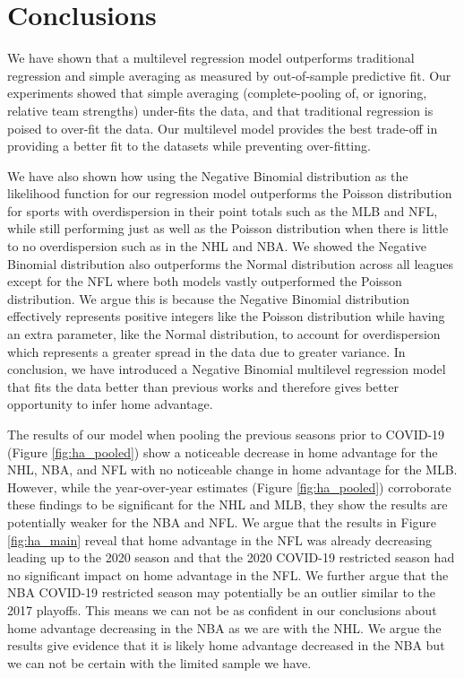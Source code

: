 \section*{Conclusions}

We have shown that a multilevel regression model outperforms traditional regression and simple averaging as measured by out-of-sample predictive fit. Our experiments showed that simple averaging (complete-pooling of, or ignoring, relative team strengths) under-fits the data, and that traditional regression is poised to over-fit the data. Our multilevel model provides the best trade-off in providing a better fit to the datasets while preventing over-fitting. 

We have also shown how using the Negative Binomial distribution as the likelihood function for our regression model outperforms the Poisson distribution for sports with overdispersion in their point totals such as the MLB and NFL, while still performing just as well as the Poisson distribution when there is little to no overdispersion such as in the NHL and NBA. We showed the Negative Binomial distribution also outperforms the Normal distribution across all leagues except for the NFL where both models vastly outperformed the Poisson distribution. We argue this is because the Negative Binomial distribution effectively represents positive integers like the Poisson distribution while having an extra parameter, like the Normal distribution, to account for overdispersion which represents a greater spread in the data due to greater variance. In conclusion, we have introduced a Negative Binomial multilevel regression model that fits the data better than previous works and therefore gives better opportunity to infer home advantage.

The results of our model when pooling the previous seasons prior to COVID-19 (Figure \mbox{\ref{fig:ha_pooled}}) show a noticeable decrease in home advantage for the NHL, NBA, and NFL with no noticeable change in home advantage for the MLB. However, while the year-over-year estimates (Figure \mbox{\ref{fig:ha_pooled}}) corroborate these findings to be significant for the NHL and MLB, they show the results are potentially weaker for the NBA and NFL. We argue that the results in Figure \mbox{\ref{fig:ha_main}} reveal that home advantage in the NFL was already decreasing leading up to the 2020 season and that the 2020 COVID-19 restricted season had no significant impact on home advantage in the NFL. We further argue that the NBA COVID-19 restricted season may potentially be an outlier similar to the 2017 playoffs. This means we can not be as confident in our conclusions about home advantage decreasing in the NBA as we are with the NHL. We argue the results give evidence that it is likely home advantage decreased in the NBA but we can not be certain with the limited sample we have.